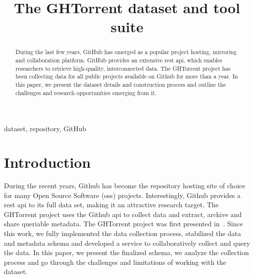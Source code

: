 \documentclass[conference]{IEEEtran}
\begin{document}
\title{The GHTorrent dataset and tool suite}

\author{ 
}

\maketitle

\begin{abstract} 
  
  During the last few years, GitHub has emerged as a popular project hosting,
  mirroring and collaboration platform. GitHub provides an extensive {\sc rest
  api}, which enables researchers to retrieve high-quality, interconnected data.
  The GHTorrent project has been collecting data for all public projects
  available on Github for more than a year. In this paper, we present the dataset
  details and construction process and outline the challenges and research
  opportunities emerging from it.

\end{abstract}

\begin{IEEEkeywords}
dataset, repository, GitHub
\end{IEEEkeywords}

\section{Introduction} During the recent years, Github has become the repository
hosting site of choice for many Open Source Software ({\sc oss}) projects.
Interestingly, Github provides a {\sc rest api} to its full data set, making it
an attractive research target. The GHTorrent project uses the Github {\sc api}
to collect data and extract, archive and share queriable metadata. The
GHTorrent project was first presented in~\cite{GS12}. Since this work, we fully
implemented the data collection process, stabilized the data and metadata schema
and developed a service to collaboratively collect and query the data. In
this paper, we present the finalized schema, we analyze the collection process
and go through the challenges and limitations of working with the dataset.
\end{document}
